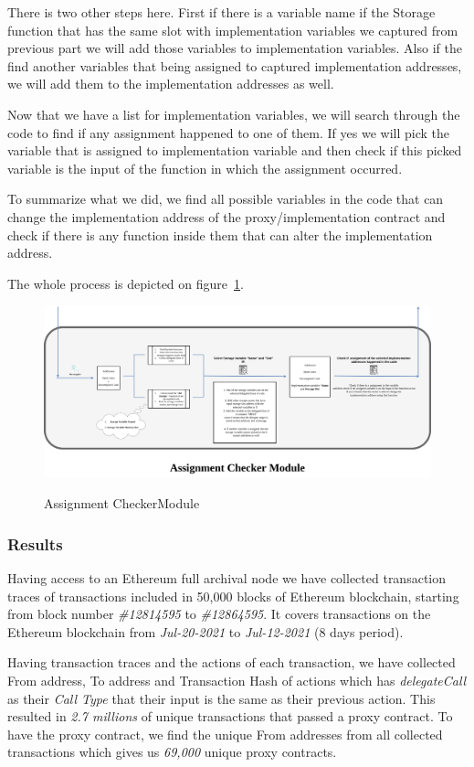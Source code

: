 There is two other steps here. First if there is a variable name if the Storage function that has the same slot with implementation variables we captured from previous part we will add those variables to implementation variables. Also if the find another variables that being assigned to captured implementation addresses, we will add them to the implementation addresses as well.

Now that we have a list for implementation variables, we will search through the code to find if any assignment happened to one of them. If yes we will pick the variable that is assigned to implementation variable and then check if this picked variable is the input of the function in which the assignment occurred.

To summarize what we did, we find all possible variables in the code that can change the implementation address of the proxy/implementation contract and check if there is any function inside them that can alter the implementation address.

The whole process is depicted on figure~\ref{assignmentFinder}.

\begin{figure}[t]
  \includegraphics[width=1.2\textwidth]{figures/Assignment_finder.png}\label{assignmentFinder}
  \caption{Assignment CheckerModule}
\end{figure}

\subsubsection{Results}
Having access to an Ethereum full archival node we have collected transaction traces of transactions included in 50,000 blocks of Ethereum blockchain, starting from block number \textit{\#12814595} to \textit{\#12864595}. It covers transactions on the Ethereum blockchain from \textit{Jul-20-2021} to \textit{Jul-12-2021} (8 days period). 

Having transaction traces and the actions of each transaction, we have collected From address, To address and Transaction Hash of actions which has \textit{delegateCall} as their \textit{Call Type} that their input is the same as their previous action. This resulted in \textit{2.7 millions} of unique transactions that passed a proxy contract.
To have the proxy contract, we find the unique From addresses from all collected transactions which gives us \textit{69,000} unique proxy contracts. 


